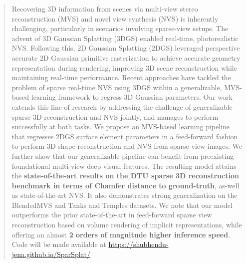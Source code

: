 \begin{abstract}
Recovering 3D information from scenes via multi-view stereo reconstruction (MVS) and novel view synthesis (NVS) is inherently challenging, particularly in scenarios involving sparse-view setups. The advent of $3$D Gaussian Splatting ($3$DGS) enabled real-time, photorealistic NVS. Following this, $2$D Gaussian Splatting ($2$DGS) leveraged perspective accurate $2$D Gaussian primitive rasterization to achieve accurate geometry representation during rendering, improving 3D scene reconstruction while maintaining real-time performance. Recent approaches have tackled the problem of sparse real-time NVS using $3$DGS within a generalizable, MVS-based learning framework to regress $3$D Gaussian parameters. Our work extends this line of research by addressing the challenge of generalizable sparse $3$D reconstruction and NVS jointly, and manages to perform successfully at both tasks. We propose an MVS-based learning pipeline that regresses 2DGS surface element parameters in a feed-forward fashion to perform $3$D shape reconstruction and NVS from sparse-view images. We further show that our generalizable pipeline can benefit from preexisting foundational multi-view deep visual features. The resulting model attains 
the \textbf{state-of-the-art results on the DTU sparse 3D reconstruction benchmark in terms of Chamfer distance to ground-truth}, as-well as state-of-the-art NVS. It also demonstrates strong generalization on the BlendedMVS and Tanks and Temples datasets. We note that our model outperforms the prior state-of-the-art in feed-forward sparse view reconstruction based on volume rendering of implicit representations, while offering an almost \textbf{2 orders of magnitude higher inference speed}. Code will be made available at \href{https://shubhendu-jena.github.io/SparSplat/}{https://shubhendu-jena.github.io/SparSplat/}
\end{abstract}
